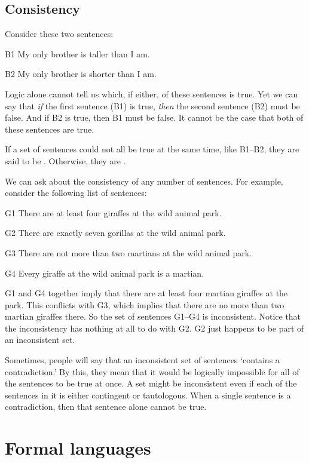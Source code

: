 \subsection{Consistency}
Consider these two sentences:
\begin{ekey}
\item[B1] My only brother is taller than I am.
\item[B2] My only brother is shorter than I am.
\end{ekey}
Logic alone cannot tell us which, if either, of these sentences is true. Yet we can say that \emph{if} the first sentence (B1) is true, \emph{then} the second sentence (B2) must be false. And if B2 is true, then B1 must be false. It cannot be the case that both of these sentences are true.

If a set of sentences could not all be true at the same time, like B1--B2, they are said to be . Otherwise, they are .

We can ask about the consistency of any number of sentences. For example, consider the following list of sentences:
\label{MartianGiraffes}
\begin{ekey}
\item[G1] There are at least four giraffes at the wild animal park.
\item[G2] There are exactly seven gorillas at the wild animal park.
\item[G3] There are not more than two martians at the wild animal park.
\item[G4] Every giraffe at the wild animal park is a martian.
\end{ekey}
G1 and G4 together imply that there are at least four martian giraffes at the park. This conflicts with G3, which implies that there are no more than two martian giraffes there. So the set of sentences G1--G4 is inconsistent. Notice that the inconsistency has nothing at all to do with G2. G2 just happens to be part of an inconsistent set.

Sometimes, people will say that an inconsistent set of sentences `contains a contradiction.' By this, they mean that it would be logically impossible for all of the sentences to be true at once. A set might be inconsistent even if each of the sentences in it is either contingent or tautologous. When a single sentence is a contradiction, then that sentence alone cannot be true.



\section{Formal languages}


